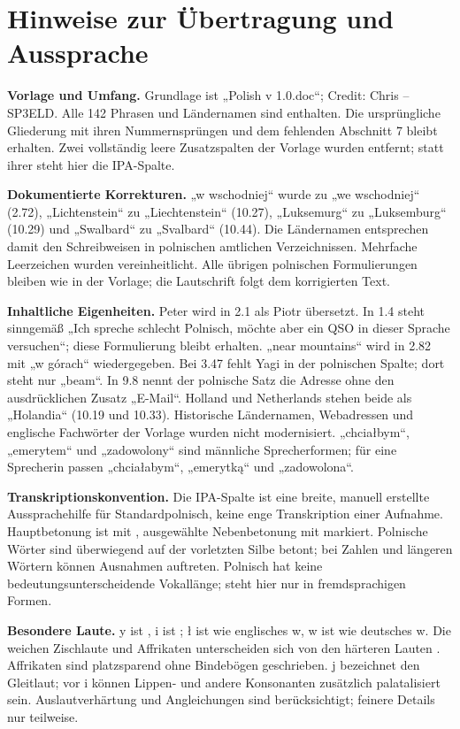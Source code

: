 \documentclass[a4paper,landscape,10pt]{article}
\newcommand{\ipa}[1]{{\ipafont[#1]}}
\begin{document}
\section*{Hinweise zur Übertragung und Aussprache}
\fontsize{8.5}{10.5}\selectfont\raggedright
\textbf{Vorlage und Umfang.} Grundlage ist „Polish v 1.0.doc“; Credit: Chris -- SP3ELD.
Alle 142 Phrasen und Ländernamen sind enthalten. Die ursprüngliche Gliederung mit ihren Nummernsprüngen
und dem fehlenden Abschnitt 7 bleibt erhalten. Zwei vollständig leere Zusatzspalten der Vorlage wurden
entfernt; statt ihrer steht hier die IPA-Spalte.

\smallskip
\textbf{Dokumentierte Korrekturen.} „w wschodniej“ wurde zu „we wschodniej“ (2.72),
„Lichtenstein“ zu „Liechtenstein“ (10.27), „Luksemurg“ zu „Luksemburg“ (10.29) und
„Swalbard“ zu „Svalbard“ (10.44). Die Ländernamen entsprechen damit den Schreibweisen in polnischen
amtlichen Verzeichnissen. Mehrfache Leerzeichen wurden vereinheitlicht. Alle übrigen polnischen
Formulierungen bleiben wie in der Vorlage; die Lautschrift folgt dem korrigierten Text.

\smallskip
\textbf{Inhaltliche Eigenheiten.} Peter wird in 2.1 als Piotr übersetzt. In 1.4 steht sinngemäß
„Ich spreche schlecht Polnisch, möchte aber ein QSO in dieser Sprache versuchen“; diese Formulierung
bleibt erhalten. „near mountains“ wird in 2.82 mit „w górach“ wiedergegeben. Bei 3.47 fehlt Yagi in der
polnischen Spalte; dort steht nur „beam“. In 9.8 nennt der polnische Satz die Adresse ohne den ausdrücklichen
Zusatz „E-Mail“. Holland und Netherlands stehen beide als „Holandia“ (10.19 und 10.33).
Historische Ländernamen, Webadressen und englische Fachwörter der Vorlage wurden nicht modernisiert.
„chciałbym“, „emerytem“ und „zadowolony“ sind männliche Sprecherformen; für eine Sprecherin passen
„chciałabym“, „emerytką“ und „zadowolona“.

\smallskip
\textbf{Transkriptionskonvention.} Die IPA-Spalte ist eine breite, manuell erstellte Aussprachehilfe
für Standardpolnisch, keine enge Transkription einer Aufnahme. Hauptbetonung ist mit \ipa{ˈ}, ausgewählte
Nebenbetonung mit \ipa{ˌ} markiert. Polnische Wörter sind überwiegend auf der vorletzten Silbe betont;
bei Zahlen und längeren Wörtern können Ausnahmen auftreten. Polnisch hat keine bedeutungsunterscheidende Vokallänge; \ipa{ː} steht hier nur in fremdsprachigen Formen.

\smallskip
\textbf{Besondere Laute.} y ist \ipa{ɨ}, i ist \ipa{i}; ł ist \ipa{w} wie englisches w,
w ist \ipa{v} wie deutsches w. Die weichen Zischlaute \ipa{ɕ, ʑ} und Affrikaten \ipa{tɕ, dʑ}
unterscheiden sich von den härteren Lauten \ipa{ʂ, ʐ, tʂ, dʐ}. Affrikaten sind platzsparend ohne Bindebögen
geschrieben. j bezeichnet den Gleitlaut; vor i können Lippen- und andere Konsonanten zusätzlich palatalisiert
sein. Auslautverhärtung und Angleichungen sind berücksichtigt; feinere Details nur teilweise.
\end{document}

